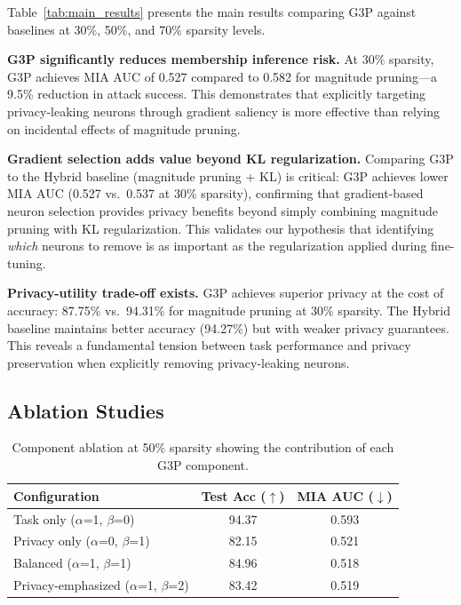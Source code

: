 \documentclass[11pt]{article}
\begin{document}
Table~\ref{tab:main_results} presents the main results comparing G3P against baselines at 30\%, 50\%, and 70\% sparsity levels.

\textbf{G3P significantly reduces membership inference risk.} At 30\% sparsity, G3P achieves MIA AUC of 0.527 compared to 0.582 for magnitude pruning---a 9.5\% reduction in attack success. This demonstrates that explicitly targeting privacy-leaking neurons through gradient saliency is more effective than relying on incidental effects of magnitude pruning.

\textbf{Gradient selection adds value beyond KL regularization.} Comparing G3P to the Hybrid baseline (magnitude pruning + KL) is critical: G3P achieves lower MIA AUC (0.527 vs.~0.537 at 30\% sparsity), confirming that gradient-based neuron selection provides privacy benefits beyond simply combining magnitude pruning with KL regularization. This validates our hypothesis that identifying \emph{which} neurons to remove is as important as the regularization applied during fine-tuning.

\textbf{Privacy-utility trade-off exists.} G3P achieves superior privacy at the cost of accuracy: 87.75\% vs.~94.31\% for magnitude pruning at 30\% sparsity. The Hybrid baseline maintains better accuracy (94.27\%) but with weaker privacy guarantees. This reveals a fundamental tension between task performance and privacy preservation when explicitly removing privacy-leaking neurons.

\subsection{Ablation Studies}

\begin{table}[h]
\caption{Component ablation at 50\% sparsity showing the contribution of each G3P component.}
\label{tab:ablation}
\centering
\small
\begin{tabular}{lcc}
\toprule
\textbf{Configuration} & \textbf{Test Acc ($\uparrow$)} & \textbf{MIA AUC ($\downarrow$)} \\
\midrule
Task only ($\alpha$=1, $\beta$=0) & 94.37 & 0.593 \\
Privacy only ($\alpha$=0, $\beta$=1) & 82.15 & 0.521 \\
Balanced ($\alpha$=1, $\beta$=1) & 84.96 & 0.518 \\
Privacy-emphasized ($\alpha$=1, $\beta$=2) & 83.42 & 0.519 \\
\bottomrule
\end{tabular}
\end{table}
\end{document}
